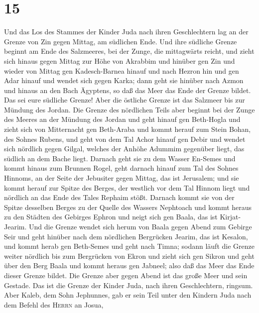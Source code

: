 \hypertarget{section-14}{%
\section{15}\label{section-14}}

 Und das Los des Stammes der Kinder Juda nach ihren
Geschlechtern lag an der Grenze von Zin gegen Mittag, am südlichen Ende.
 Und ihre südliche Grenze beginnt am Ende des Salzmeeres,
bei der Zunge, die mittagwärts reicht,  und zieht sich
hinaus gegen Mittag zur Höhe von Akrabbim und hinüber gen Zin und wieder
von Mittag gen Kadesch-Barnea hinauf und nach Hezron hin und gen Adar
hinauf und wendet sich gegen Karka;  dann geht sie hinüber
nach Azmon und hinaus an den Bach Ägyptens, so daß das Meer das Ende der
Grenze bildet. Das sei eure südliche Grenze!  Aber die
östliche Grenze ist das Salzmeer bis zur Mündung des Jordan. Die Grenze
des nördlichen Teils aber beginnt bei der Zunge des Meeres an der
Mündung des Jordan  und geht hinauf gen Beth-Hogla und
zieht sich von Mitternacht gen Beth-Araba und kommt herauf zum Stein
Bohan,  des Sohnes Rubens, und geht von dem Tal Achor
hinauf gen Debir und wendet sich nördlich gegen Gilgal, welches der
Anhöhe Adummim gegenüber liegt, das südlich an dem Bache liegt. Darnach
geht sie zu dem Wasser En-Semes und kommt hinaus zum Brunnen Rogel,
 geht darnach hinauf zum Tal des Sohnes Hinnoms, an der
Seite der Jebusiter gegen Mittag, das ist Jerusalem; und sie kommt
herauf zur Spitze des Berges, der westlich vor dem Tal Hinnom liegt und
nördlich an das Ende des Tales Rephaim stößt.  Darnach
kommt sie von der Spitze desselben Berges zu der Quelle des Wassers
Nephtoach und kommt heraus zu den Städten des Gebirges Ephron und neigt
sich gen Baala, das ist Kirjat-Jearim.  Und die Grenze
wendet sich herum von Baala gegen Abend zum Gebirge Seir und geht
hinüber nach dem nördlichen Bergrücken Jearim, das ist Kesalon, und
kommt herab gen Beth-Semes und geht nach Timna;  sodann
läuft die Grenze weiter nördlich bis zum Bergrücken von Ekron und zieht
sich gen Sikron und geht über den Berg Baala und kommt heraus gen
Jabneel; also daß das Meer das Ende dieser Grenze bildet.
 Die Grenze aber gegen Abend ist das große Meer und sein
Gestade. Das ist die Grenze der Kinder Juda, nach ihren Geschlechtern,
ringsum.  Aber Kaleb, dem Sohn Jephunnes, gab er sein
Teil unter den Kindern Juda nach dem Befehl des \textsc{Herrn} an Josua,

